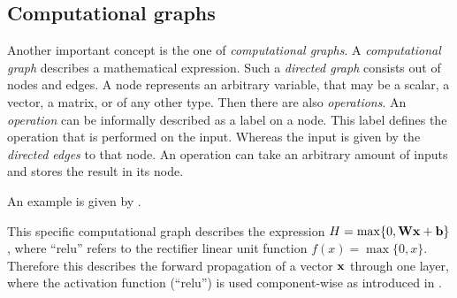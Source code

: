 \subsection{Computational graphs}
\label{sec:computational-graphs}

Another important concept is the one of \emph{computational graphs}.
A \emph{computational graph} describes a mathematical expression.
Such a \emph{directed graph} consists out of nodes and edges.
A node represents an arbitrary variable, that may be a scalar, a vector, a matrix, or of any other type.
Then there are also \emph{operations}.
An \emph{operation} can be informally described as a label on a node.
This label defines the operation that is performed on the input.
Whereas the input is given by the \emph{directed edges} to that node.
An operation can take an arbitrary amount of inputs and stores the result in its node.

An example is given by .


This specific computational graph describes the expression \(H = \max\{0, \mathbf{W}\mathbf{x} + \mathbf{b}\}\), 
where \enquote{relu} refers to the rectifier linear unit function \(f(x) = \max\{0, x\}\).
Therefore this describes the forward propagation of a vector \(\mathbf{x}\) through one layer, where the activation function (\enquote{relu}) is used component-wise as introduced in .